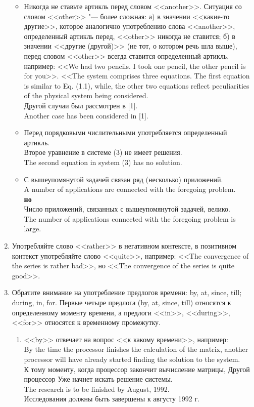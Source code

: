 \documentclass[a5paper, 10pt, twoside, numbers=enddot]{scrartcl}
\begin{document}
\begin{enumerate}
\begin{itemize}
   \item Никогда не ставьте артикль перед словом <<another>>. Ситуация со словом <<other>> "--- более сложная: а) в значении <<какие-то другие>>, которое аналогично употреблению слова <<another>>, определенный артикль перед, <<other>> никогда не ставится; б) в значении <<другие (другой)>> (не тот, о котором речь шла выше), перед словом <<other>> всегда ставится определенный артикль, например: <<We had two pencils. I took one pencil, the other pencil is for you>>. <<The system comprises three equations. The first equation is similar to Eq. (1.1), while, the other two equations reflect peculiarities of the physical system being considered. \\ [4pt] \textsf{
     Другой случаи был рассмотрен в [1]. \\
     Another case has been considered in [1].}
  
   \item Перед порядковыми числительными употребляется определенный артикль. \\ [4pt] \textsf{
     Второе уравнение в системе (3) не имеет решения. \\
     The second equation in system (3) has no solution.}

   \item \textsf{С вышеупомянутой задачей связан ряд (несколько) приложений. \\ 
     A number of applications are connected with the foregoing problem. \\ [4pt]
     \textbf{но} \\ [4pt]
     Число приложений, связанных с вышеупомянутой задачей, велико. \\
     The number of applications connected with the foregoing problem is large.}
  \end{itemize}   

  \item Употребляйте слово <<rather>> в негативном контексте, в позитивном контекст употребляйте слово <<quite>>, например: <<The convergence of the series is rather bad>>, но <<The convergence of the series is quite good>>.

  \item Обратите внимание на употребление предлогов времени: by, at, since, till; during, in, for.
  Первые четыре предлога (by, at, since, till) относятся к определенному моменту времени, а предлоги <<in>>, <<during>>, <<for>> относятся к временному промежутку.
  \begin{enumerate}
    \item <<by>> отвечает на вопрос <<к какому времени>>, например: \\ [4pt]
    \textsf{By the time the processor finishes the calculation of the matrix, another processor will have already started finding the solution to the system.\\
    К тому моменту, когда процессор закончит вычисление матрицы, Другой процессор Уже начнет искать решение системы.\\ [3pt]
    The research is to be finished by August, 1992. \\
    Исследования должны быть завершены к августу 1992 г.}
    

\end{enumerate}
\end{enumerate}
\end{document}
